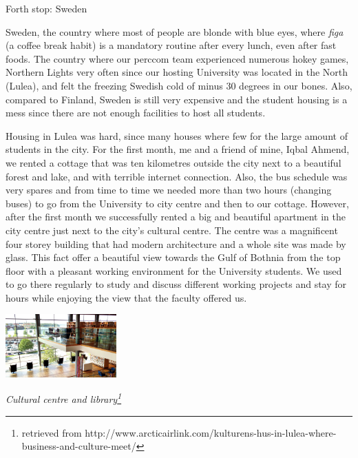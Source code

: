 \documentclass[10pt,a4paper]{article} %
\newcommand{\NewsItem}[1]{ %
\usefont{T1}{fvs}{n}{n} %
\vspace{24pt}\large #1\vspace{3pt} %
\par \normalsize \normalfont}
\begin{document}
\begin{multicols}{3}
\NewsItem{Forth stop: Sweden}

Sweden, the country where most of people are blonde with blue eyes, 
where \textit{figa} (a coffee break habit) is a mandatory routine 
after every lunch, even after fast foods. 
The country where our {\sc perccom} team experienced numerous hokey games, Northern 
Lights very often since our hosting University was located in the North (Lulea), and 
felt the freezing Swedish cold of minus 30 degrees in our bones. 
Also, compared to Finland, Sweden is still very expensive and the student housing is 
a mess since there are not enough facilities to host all students. 


Housing in Lulea was hard, since many houses where few for the large amount of 
students in the city. 
For the first month, me and a friend of mine, Iqbal Ahmend, we rented a cottage 
that was ten kilometres outside the city next to a beautiful forest and lake, and 
with terrible internet connection. 
Also, the bus schedule was very spares and from time to time we needed more than two 
hours (changing buses) to go from the University to city centre and then to our 
cottage. 
However, after the first month we successfully rented a big and beautiful apartment 
in the city centre just next to the city's cultural centre. 
The centre was a magnificent four storey building that had modern architecture and 
a whole site was made by glass. 
This fact offer a beautiful view towards the Gulf of Bothnia from the top floor with 
a pleasant working environment for the University students. 
We used to go there regularly to study and discuss different working projects and 
stay for hours while enjoying the view that the faculty offered us.


\begin{center}
	\includegraphics[width=0.32\textwidth]{media/cultural_centre_lulea.jpg}
	\par\textit{Cultural centre and library\footnote{retrieved from http://www.arcticairlink.com/kulturens-hus-in-lulea-where-business-and-culture-meet/}}
\end{center}



\end{multicols}
\end{document}

